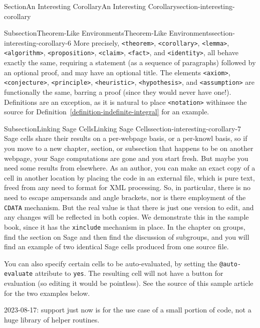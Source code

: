 \documentclass[twoside,10pt,]{article}
\newcommand{\xreffont}{\relax}
\newcommand{\mono}[1]{\texttt{#1}}
\numberwithin{equation}{section}
\begin{document}
\begin{sectionptx}{Section}{An Interesting Corollary}{}{An Interesting Corollary}{}{}{section-interesting-corollary}
\begin{subsectionptx}{Subsection}{Theorem-Like Environments}{}{Theorem-Like Environments}{}{}{section-interesting-corollary-6}
More precisely, \mono{<theorem>}, \mono{<corollary>}, \mono{<lemma>}, \mono{<algorithm>}, \mono{<proposition>}, \mono{<claim>}, \mono{<fact>}, and \mono{<identity>}, all behave exactly the same, requiring a statement (as a sequence of paragraphs) followed by an optional proof, and may have an optional title.  The elements \mono{<axiom>}, \mono{<conjecture>}, \mono{<principle>}, \mono{<heuristic>}, \mono{<hypothesis>}, and \mono{<assumption>} are functionally the same, barring a proof (since they would never have one!).  Definitions are an exception, as it is natural to place \mono{<notation>} within\textemdash{}see the source for Definition~\hyperref[definition-indefinite-integral]{{\xreffont\ref{definition-indefinite-integral}}} for an example.%
\end{subsectionptx}
%
%
\typeout{************************************************}
\typeout{************************************************}
%
\begin{subsectionptx}{Subsection}{Linking Sage Cells}{}{Linking Sage Cells}{}{}{section-interesting-corollary-7}
%
Sage cells share their results on a per-webpage basis, or a per-knowl basis, so if you move to a new chapter, section, or subsection that happens to be on another webpage, your Sage computations are gone and you start fresh.  But maybe you need some results from elsewhere.  As an author, you can make an exact copy of a cell in another location by placing the code in an external file, which is pure text, freed from any need to format for XML processing.  So, in particular, there is no need to escape ampersands and angle brackets, nor is there employment of the \mono{CDATA} mechanism.  But the real value is that there is just one version to edit, and any changes will be reflected in both copies.  We demonstrate this in the sample book, since it has the \mono{xinclude} mechanism in place.  In the chapter on groups, find the section on Sage and then find the discussion of subgroups, and you will find an example of two identical Sage cells produced from one source file.%
\par
You can also specify certain cells to be auto-evaluated, by setting the \mono{@auto-evaluate} attribute to \mono{yes}.  The resulting cell will not have a button for evaluation (so editing it would be pointless).  See the source of this sample article for the two examples below.%
\par
2023-08-17: support just now is for the use case of a small portion of code, not a huge library of helper routines.%

\end{subsectionptx}
\end{sectionptx}
\end{document}
